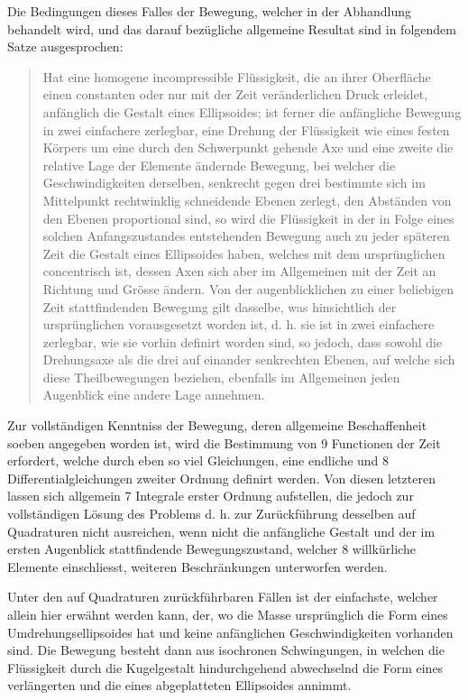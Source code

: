 \documentclass[11pt]{article}
\begin{document}
Die Bedingungen dieses Falles der Bewegung, welcher in der Abhandlung behandelt wird, und das darauf bezügliche allgemeine Resultat sind in folgendem Satze ausgesprochen:

\begin{quote}
Hat eine homogene incompressible Flüssigkeit, die an ihrer Oberfläche einen constanten oder nur mit der Zeit veränderlichen Druck erleidet, anfänglich die Gestalt eines Ellipsoides; ist ferner die anfängliche Bewegung in zwei einfachere zerlegbar, eine Drehung der Flüssigkeit wie eines festen Körpers um eine durch den Schwerpunkt gehende Axe und eine zweite die relative Lage der Elemente ändernde Bewegung, bei welcher die Geschwindigkeiten derselben, senkrecht gegen drei bestimmte sich im Mittelpunkt rechtwinklig schneidende Ebenen zerlegt, den Abständen von den Ebenen proportional sind, so wird die Flüssigkeit in der in Folge eines solchen Anfangszustandes entstehenden Bewegung auch zu jeder späteren Zeit die Gestalt eines Ellipsoides haben, welches mit dem ursprünglichen concentrisch ist, dessen Axen sich aber im Allgemeinen mit der Zeit an Richtung und Grösse ändern. Von der augenblicklichen zu einer beliebigen Zeit stattfindenden Bewegung gilt dasselbe, was hinsichtlich der ursprünglichen vorausgesetzt worden ist, d. h. sie ist in zwei einfachere zerlegbar, wie sie vorhin definirt worden sind, so jedoch, dass sowohl die Drehungsaxe als die drei auf einander senkrechten Ebenen, auf welche sich diese Theilbewegungen beziehen, ebenfalls im Allgemeinen jeden Augenblick eine andere Lage annehmen.
\end{quote}

Zur vollständigen Kenntniss der Bewegung, deren allgemeine Beschaffenheit soeben angegeben worden ist, wird die Bestimmung von 9 Functionen der Zeit erfordert, welche durch eben so viel Gleichungen, eine endliche und 8 Differentialgleichungen zweiter Ordnung definirt werden. Von diesen letzteren lassen sich allgemein 7 Integrale erster Ordnung aufstellen, die jedoch zur vollständigen Lösung des Problems d. h. zur Zurückführung desselben auf Quadraturen nicht ausreichen, wenn nicht die anfängliche Gestalt und der im ersten Augenblick stattfindende Bewegungszustand, welcher 8 willkürliche Elemente einschliesst, weiteren Beschränkungen unterworfen werden.

Unter den auf Quadraturen zurückführbaren Fällen ist der einfachste, welcher allein hier erwähnt werden kann, der, wo die Masse ursprünglich die Form eines Umdrehungsellipsoides hat und keine anfänglichen Geschwindigkeiten vorhanden sind. Die Bewegung besteht dann aus isochronen Schwingungen, in welchen die Flüssigkeit durch die Kugelgestalt hindurchgehend abwechselnd die Form eines verlängerten und die eines abgeplatteten Ellipsoides annimmt.
\end{document}
